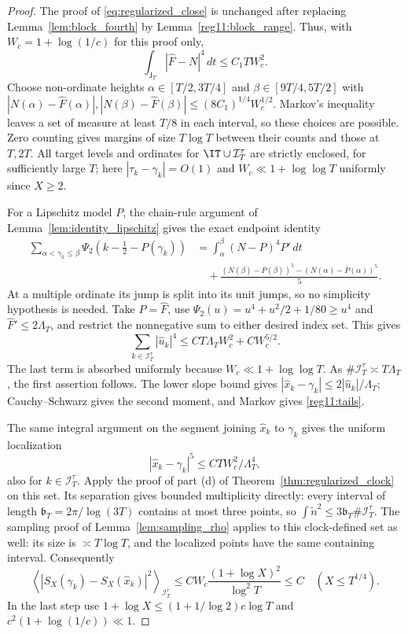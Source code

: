 \begin{proof}
The proof of \eqref{eq:regularized_close} is unchanged after replacing
Lemma~\ref{lem:block_fourth} by Lemma~\ref{reg11:block_range}. Thus, with
$W_c=1+\log(1/c)$ for this proof only,
\[
\int_{\mathsf J_T}|\widehat F-N|^4\,dt\le C_1T W_c^2.
\]
Choose non-ordinate heights $\alpha\in[T/2,3T/4]$ and
$\beta\in[9T/4,5T/2]$ with
$|N(\alpha)-\widehat F(\alpha)|,
|N(\beta)-\widehat F(\beta)|\le(8C_1)^{1/4}W_c^{1/2}$.
Markov's inequality leaves a set of measure at least $T/8$ in each
interval, so these choices are possible. Zero counting gives margins
of size $T\log T$ between their counts and those at $T,2T$.
All target levels and ordinates for $\IT\cup\mathcal I_T^\tau$ are
strictly enclosed, for sufficiently large $T$; here
$|\tau_k-\gamma_k|=O(1)$ and $W_c\ll1+\log\log T$ uniformly since $X\ge2$.

For a Lipschitz model $P$, the chain-rule argument of
Lemma~\ref{lem:identity_lipschitz} gives the exact endpoint identity
\begin{equation}
\begin{split}
\sum_{\alpha<\gamma_k\le\beta}\Psi_2(k-\tfrac12-P(\gamma_k))
&=\int_\alpha^\beta(N-P)^4P'\,dt\\
&\quad+\frac{(N(\beta)-P(\beta))^5-(N(\alpha)-P(\alpha))^5}{5}.
\end{split}
\label{reg11:endpoint_identity}
\end{equation}
At a multiple ordinate its jump is split into its unit jumps, so no
simplicity hypothesis is needed. Take $P=\widehat F$, use
$\Psi_2(u)=u^4+u^2/2+1/80\ge u^4$ and $\widehat F'\le2\Lambda_T$,
and restrict the nonnegative sum to either desired index set. This gives
\[
\sum_{k\in\mathcal I_T^\tau}|\widehat u_k|^4
\le C T\Lambda_T W_c^2+C W_c^{5/2}.
\]
The last term is absorbed uniformly because $W_c\ll1+\log\log T$.
As $\#\mathcal I_T^\tau\asymp T\Lambda_T$, the first assertion follows.
The lower slope bound gives
$|\widehat x_k-\gamma_k|\le2|\widehat u_k|/\Lambda_T$;
Cauchy--Schwarz gives the second moment, and Markov gives
\eqref{reg11:tails}.

The same integral argument on the segment joining $\widehat x_k$ to
$\gamma_k$ gives the uniform localization
\[
|\widehat x_k-\gamma_k|^5
\le C T W_c^2/\Lambda_T^4,
\]
also for $k\in\mathcal I_T^\tau$. Apply the proof of part (d) of
Theorem~\ref{thm:regularized_clock} on this set. Its separation gives
bounded multiplicity directly: every interval of length
$\mathfrak b_T=2\pi/\log(3T)$ contains at most three points, so
$\int\tilde n^2\le3\mathfrak b_T\#\mathcal I_T^\tau$.
The sampling proof of Lemma~\ref{lem:sampling_rho} applies to this
clock-defined set as well: its size is $\asymp T\log T$, and the
localized points have the same containing interval. Consequently
\[
\left\langle|S_X(\gamma_k)-S_X(\widehat x_k)|^2\right\rangle_{\mathcal I_T^\tau}
\le C W_c\frac{(1+\log X)^2}{\log^2T}\le C
\quad(X\le T^{1/4}).
\]
In the last step use $1+\log X\le(1+1/\log2)c\log T$ and
$c^2(1+\log(1/c))\ll1$.
\end{proof}

